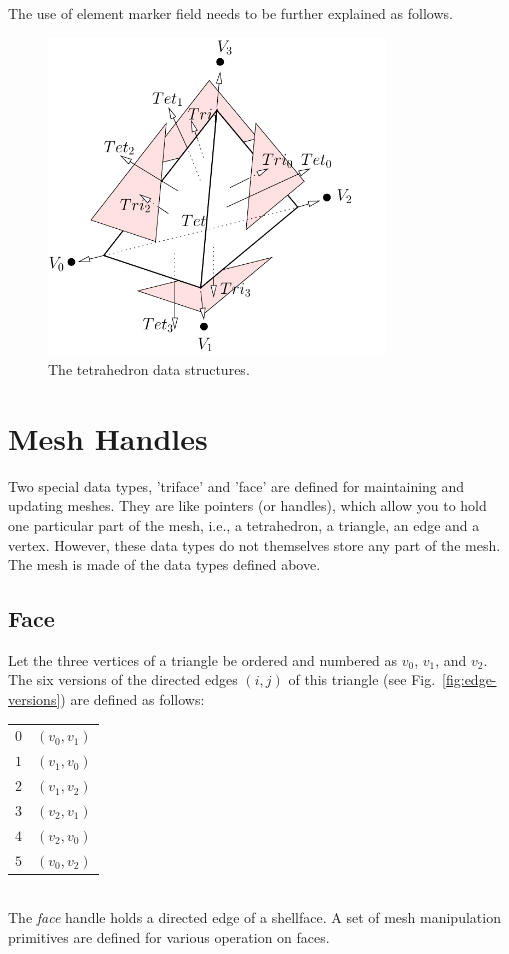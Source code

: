 The use of element marker field needs to be further explained as follows.

\begin{figure}
  \centering
  \includegraphics[width=0.8\textwidth]{../figs/tetrahedron-based}
\caption{The tetrahedron data structures.}
\label{fig:tetrahedron}
\end{figure}

\section{Mesh Handles}

Two special data types, 'triface' and 'face' are defined for maintaining and updating meshes. They are like pointers (or handles), which allow you to hold one particular part of the mesh, i.e., a tetrahedron, a triangle, an edge and a vertex.  However, these data types do not themselves store any part of the mesh. The mesh is made of the data types defined above.

\subsection{Face}

Let the three vertices of a triangle be ordered and numbered as $v_0$, $v_1$, and $v_2$. The six versions of the directed edges $(i, j)$ of this triangle (see Fig.~\ref{fig:edge-versions}) are defined as follows:\\
\begin{tabular}{rl}
$0$ & $(v_0, v_1)$\\
$1$ & $(v_1, v_0)$\\
$2$ & $(v_1, v_2)$\\
$3$ & $(v_2, v_1)$\\
$4$ & $(v_2, v_0)$\\
$5$ & $(v_0, v_2)$
\end{tabular}\\
The {\it face} handle holds a directed edge of a shellface. A set of mesh manipulation primitives are defined for various operation on faces.


